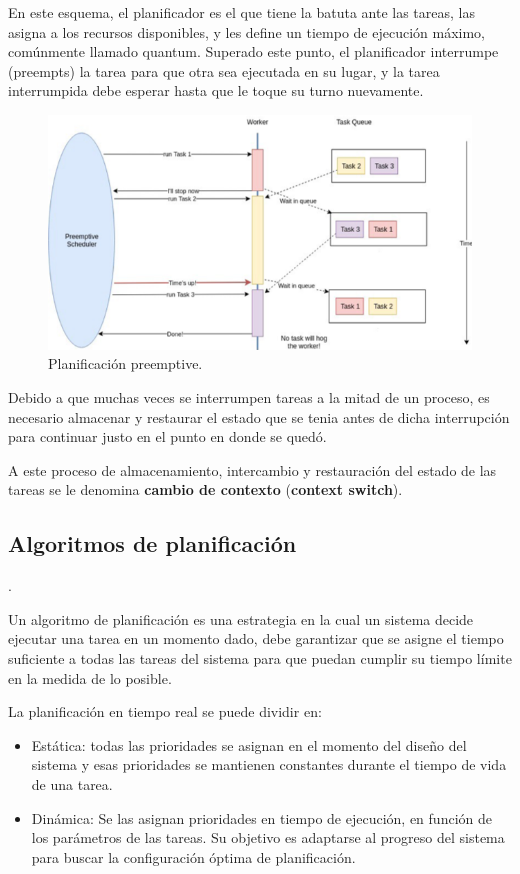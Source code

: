 En este esquema, el planificador es el que tiene la batuta ante las tareas, las asigna a los recursos disponibles, y les define un tiempo de ejecución máximo, comúnmente llamado quantum\cite{PreeK}. Superado este punto, el planificador interrumpe (preempts) la tarea para que otra sea ejecutada en su lugar, y la tarea interrumpida debe esperar hasta que le toque su turno nuevamente.

  \begin{figure}[ht]
      \centering
        \includegraphics[scale=1.5]{img/schedPre}
        \caption{Planificación preemptive.\cite{medium}}
        \label{fig:schedpree}
    \end{figure}
    
    

Debido a que muchas veces se interrumpen tareas a la mitad de un proceso, es necesario almacenar y restaurar el estado que se tenia antes de dicha interrupción para continuar justo en el punto en donde se quedó.

A este proceso de almacenamiento, intercambio y restauración del estado de las tareas se le denomina \textbf{cambio de contexto} (\textbf{context switch}).

    \subsection{Algoritmos de planificación}\label{sec:AlgoPlan}. 
    
    Un algoritmo de planificación es una estrategia en la cual un sistema decide ejecutar una tarea en un momento dado, debe garantizar que se asigne el tiempo suficiente a todas las tareas del sistema para que puedan cumplir su tiempo límite en la medida de lo posible.
    
    La planificación en tiempo real se puede dividir en:
    \begin{itemize}
    \item Estática:  todas las prioridades se asignan en el momento del diseño del sistema y esas prioridades se mantienen constantes durante el tiempo de vida de una tarea.
    \item Dinámica: Se las asignan prioridades en tiempo de ejecución, en función de los parámetros de las tareas. Su objetivo es adaptarse al progreso del sistema para buscar la configuración óptima de planificación.
    \end{itemize}   

